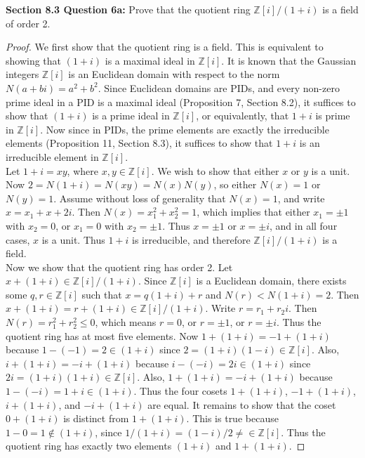 \documentclass{article}
\begin{document}
\textbf{Section 8.3 Question 6a:} Prove that the quotient ring
  $\mathbb{Z}[i]/(1+i)$ is a field of order 2.
  \begin{proof}
    We first show that the quotient ring is a field. This is equivalent to
    showing that $(1+i)$ is a maximal ideal in $\mathbb{Z}[i]$.  It is
    known that the Gaussian integers $\mathbb{Z}[i]$ is an Euclidean domain
    with respect to the norm $N(a+bi)=a^2+b^2$. Since Euclidean domains are
    PIDs, and every non-zero prime ideal in a PID is a maximal ideal
    (Proposition 7, Section 8.2), it suffices to show that $(1+i)$ is a
    prime ideal in $\mathbb{Z}[i]$, or equivalently, that $1+i$ is prime in
    $\mathbb{Z}[i]$. Now since in PIDs, the prime elements are exactly the
    irreducible elements (Proposition 11, Section 8.3), it suffices to show
    that $1+i$ is an irreducible element in $\mathbb{Z}[i]$. \\

    Let $1+i=xy$, where $x,y\in\mathbb{Z}[i]$. We wish to show that either
    $x$ or $y$ is a unit. Now $2=N(1+i)=N(xy)=N(x)N(y)$, so either $N(x)=1$
    or $N(y)=1$. Assume without loss of generality that $N(x)=1$, and write
    $x=x_1+x+2i$. Then $N(x)=x_1^2+x_2^2=1$, which implies that either
    $x_1=\pm1$ with $x_2=0$, or $x_1=0$ with $x_2=\pm1$. Thus $x=\pm1$ or
    $x=\pm i$, and in all four cases, $x$ is a unit. Thus $1+i$ is
    irreducible, and therefore $\mathbb{Z}[i]/(1+i)$ is a field. \\

    Now we show that the quotient ring has order 2. Let
    $x+(1+i)\in\mathbb{Z}[i]/(1+i)$. Since $\mathbb{Z}[i]$ is a Euclidean
    domain, there exists some $q,r\in\mathbb{Z}[i]$ such that $x=q(1+i)+r$
    and $N(r)<N(1+i)=2$. Then $x+(1+i)=r+(1+i)\in\mathbb{Z}[i]/(1+i)$.
    Write $r=r_1+r_2i$. Then $N(r)=r_1^2+r_2^2\leq0$, which means $r=0$, or
    $r=\pm1$, or $r=\pm i$. Thus the quotient ring has at most five
    elements. Now $1+(1+i)=-1+(1+i)$ because $1-(-1)=2\in(1+i)$ since
    $2=(1+i)(1-i)\in\mathbb{Z}[i]$. Also, $i+(1+i)=-i+(1+i)$ because
    $i-(-i)=2i\in(1+i)$ since $2i=(1+i)(1+i)\in\mathbb{Z}[i]$. Also,
    $1+(1+i)=-i+(1+i)$ because $1-(-i)=1+i\in(1+i)$. Thus the four cosets
    $1+(1+i)$, $-1+(1+i)$, $i+(1+i)$, and $-i+(1+i)$ are equal. It remains
    to show that the coset $0+(1+i)$ is distinct from $1+(1+i)$. This is
    true because $1-0=1\not\in(1+i)$, since
    $1/(1+i)=(1-i)/2\neq\in\mathbb{Z}[i]$. Thus the quotient ring has
    exactly two elements $(1+i)$ and $1+(1+i)$.
  \end{proof}
\end{document}
